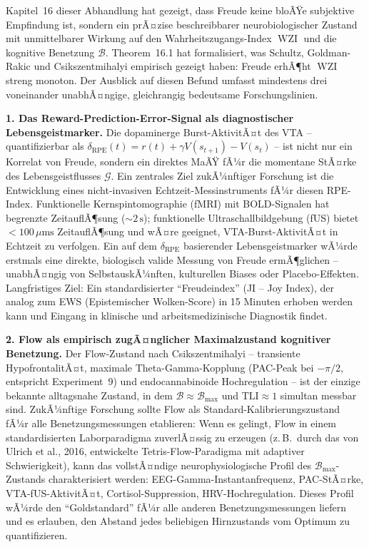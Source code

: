 ﻿\documentclass[12pt,a4paper]{report}
\theoremstyle{plain}
\theoremstyle{definition}
\theoremstyle{remark}
\DeclareMathOperator{\WZI}{WZI}
\begin{document}
	Kapitel~16 dieser Abhandlung hat gezeigt, dass Freude keine bloÃŸe
	subjektive Empfindung ist, sondern ein prÃ¤zise beschreibbarer
	neurobiologischer Zustand mit unmittelbarer Wirkung auf den
	Wahrheitszugangs-Index $\WZI$ und die kognitive Benetzung $\mathcal{B}$.
	Theorem~16.1 hat formalisiert, was Schultz, Goldman-Rakic und
	Csikszentmihalyi empirisch gezeigt haben: Freude erhÃ¶ht $\WZI$ streng monoton.
	Der Ausblick auf diesen Befund umfasst mindestens drei voneinander
	unabhÃ¤ngige, gleichrangig bedeutsame Forschungslinien.

	\textbf{1. Das Reward-Prediction-Error-Signal als diagnostischer Lebensgeistmarker.}
	Die dopaminerge Burst-AktivitÃ¤t des VTA -- quantifizierbar als
	$\delta_{\mathrm{RPE}}(t) = r(t) + \gamma V(s_{t+1}) - V(s_t)$ --
	ist nicht nur ein Korrelat von Freude, sondern ein direktes
	MaÃŸ fÃ¼r die momentane StÃ¤rke des Lebensgeistflusses $\mathcal{G}$.
	Ein zentrales Ziel zukÃ¼nftiger Forschung ist die Entwicklung eines
	nicht-invasiven Echtzeit-Messinstruments fÃ¼r diesen RPE-Index.
	Funktionelle Kernspintomographie (fMRI) mit BOLD-Signalen hat
	begrenzte ZeitauflÃ¶sung ($\sim 2\,\mathrm{s}$); funktionelle
	Ultraschallbildgebung (fUS) bietet $< 100\,\mu\mathrm{ms}$
	ZeitauflÃ¶sung und wÃ¤re geeignet, VTA-Burst-AktivitÃ¤t in
	Echtzeit zu verfolgen.
	Ein auf dem $\delta_{\mathrm{RPE}}$ basierender Lebensgeistmarker
	wÃ¼rde erstmals eine direkte, biologisch valide Messung von Freude
	ermÃ¶glichen -- unabhÃ¤ngig von SelbstauskÃ¼nften, kulturellen Biases
	oder Placebo-Effekten.
	Langfristiges Ziel: Ein standardisierter ``Freudeindex''
	(JI -- Joy Index), der analog zum EWS (Epistemischer Wolken-Score)
	in 15 Minuten erhoben werden kann und Eingang in klinische
	und arbeitsmedizinische Diagnostik findet.

	\textbf{2. Flow als empirisch zugÃ¤nglicher Maximalzustand kognitiver
		Benetzung.}
	Der Flow-Zustand nach Csikszentmihalyi -- transiente HypofrontalitÃ¤t,
	maximale Theta-Gam\-ma-Kopplung (PAC-Peak bei $-\pi/2$, entspricht
	Experiment~9) und endocannabinoide Hochregulation -- ist der
	einzige bekannte alltagsnahe Zustand, in dem $\mathcal{B} \approx
	\mathcal{B}_{\max}$ und $\mathrm{TLI} \approx 1$ simultan messbar sind.
	ZukÃ¼nftige Forschung sollte Flow als Standard-Kalibrie\-rungszustand
	fÃ¼r alle Benetzungsmessungen etablieren:
	Wenn es gelingt, Flow in einem standardisierten Laborparadigma
	zuverlÃ¤ssig zu erzeugen (z.\,B.\ durch das von Ulrich et al., 2016,
	entwickelte Tetris-Flow-Paradigma mit adaptiver Schwierigkeit),
	kann das vollstÃ¤ndige neurophysiologische Profil des
	$\mathcal{B}_{\max}$-Zustands charakterisiert werden:
	EEG-Gamma-Instantanfrequenz, PAC-StÃ¤rke, VTA-fUS-AktivitÃ¤t,
	Cortisol-Suppression, HRV-Hochregulation.
	Dieses Profil wÃ¼rde den ``Goldstandard'' fÃ¼r alle anderen
	Benetzungsmessungen liefern und es erlauben, den Abstand jedes
	beliebigen Hirnzustands vom Optimum zu quantifizieren.
\end{document}
